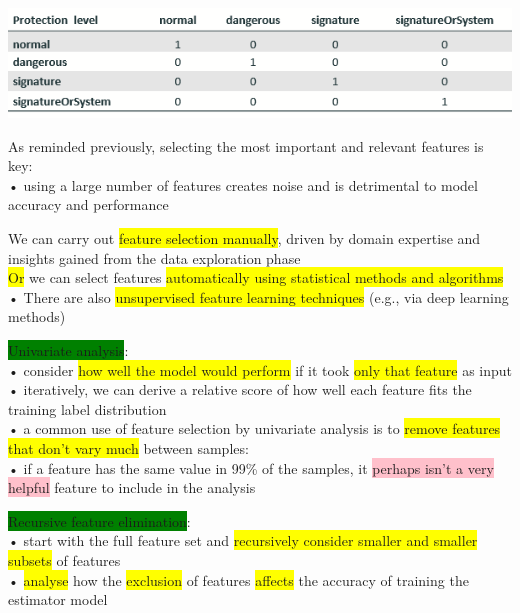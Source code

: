 \documentclass[]{project_plan}
\begin{document}
\includegraphics[width=.9\linewidth]{android permission protect level.png}

As reminded previously, selecting the most important and relevant features is key:\\
• using a large number of features creates noise and is detrimental to model accuracy and performance

We can carry out \colorbox{yellow}{feature selection manually}, driven by domain expertise and insights gained from the data exploration phase\\
\colorbox{yellow}{Or} we can select features \colorbox{yellow}{automatically using statistical methods and algorithms}\\
• There are also \colorbox{yellow}{unsupervised feature learning techniques} (e.g., via deep learning methods)

\colorbox{green}{Univariate analysis}:\\
• consider \colorbox{yellow}{how well the model would perform} if it took \colorbox{yellow}{only that feature} as input\\
• iteratively, we can derive a relative score of how well each feature fits the training label distribution\\
• a common use of feature selection by univariate analysis is to \colorbox{yellow}{remove features that don’t vary much} between samples:\\
• if a feature has the same value in 99\% of the samples, it \colorbox{pink}{perhaps isn’t a very helpful} feature to include in the analysis

\colorbox{green}{Recursive feature elimination}:\\
• start with the full feature set and \colorbox{yellow}{recursively consider smaller and smaller subsets} of features\\
• \colorbox{yellow}{analyse} how the \colorbox{yellow}{exclusion} of features \colorbox{yellow}{affects} the accuracy of training the estimator model
\end{document}
